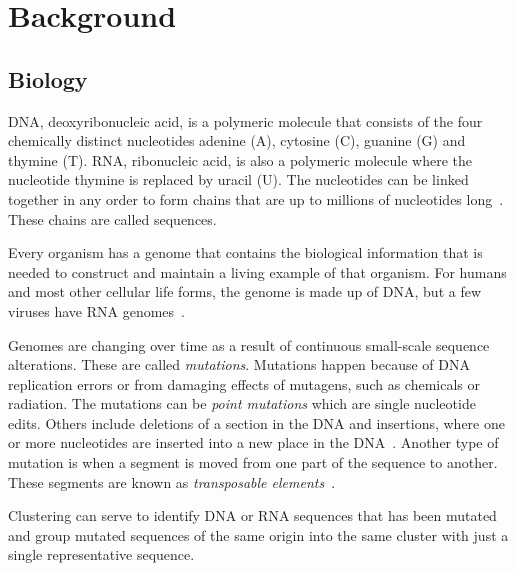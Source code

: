 \section{Background}

\subsection{Biology}
\label{sec:biology}

DNA, deoxyribonucleic acid, is a polymeric molecule that consists of the four
chemically distinct nucleotides adenine (A), cytosine (C), guanine (G) and
thymine (T). RNA, ribonucleic acid, is also a polymeric molecule where the
nucleotide thymine is replaced by uracil (U).  The nucleotides can be linked
together in any order to form chains that are up to millions of nucleotides
long~\cite[pp.~8--9]{brown}. These chains are called sequences.

Every organism has a genome that contains the biological information that is
needed to construct and maintain a living example of that organism. For humans
and most other cellular life forms, the genome is made up of DNA, but a few
viruses have RNA genomes~\cite[pp.~3--4]{brown}.

Genomes are changing over time as a result of continuous small-scale sequence
alterations. These are called \textit{mutations}. Mutations happen because of
DNA replication errors or from damaging effects of mutagens, such as chemicals
or radiation. The mutations can be \textit{point mutations} which are single
nucleotide edits. Others include deletions of a section in the DNA and
insertions, where one or more nucleotides are inserted into a new place in the
DNA~\cite[pp.~505--506]{brown}. Another type of mutation is when a segment is
moved from one part of the sequence to another. These segments are known as
\emph{transposable elements}~\cite{munoz}.

Clustering can serve to identify DNA or RNA sequences that has been mutated and
group mutated sequences of the same origin into the same cluster with just a
single representative sequence.

